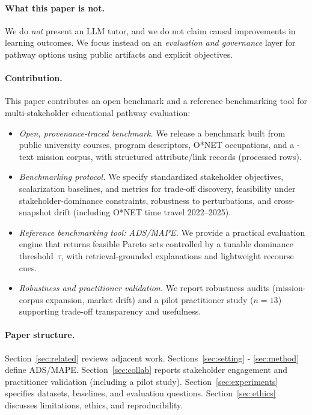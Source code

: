 \documentclass[sigconf,review]{acmart}
\newcommand{\ADS}{\textsc{ADS}\xspace}
\newcommand{\MAPE}{\textsc{MAPE}\xspace}
\begin{document}
\paragraph{What this paper is not.}
We do \emph{not} present an LLM tutor, and we do not claim causal improvements in learning outcomes. We focus instead on an \emph{evaluation and governance} layer for pathway options using public artifacts and explicit objectives.

\paragraph{Contribution.} This paper contributes an open benchmark and a reference benchmarking tool for multi-stakeholder educational pathway evaluation:
\begin{itemize}
  \item \textit{Open, provenance-traced benchmark.} We release a benchmark built from \NumCourses public university courses, \NumPrograms program descriptors, \NumOccupations O*NET occupations, and a \NumMissionsExpanded-text mission corpus, with \NumAttributeRecords structured attribute/link records (\NumProcessedRows processed rows).
  \item \textit{Benchmarking protocol.} We specify standardized stakeholder objectives, scalarization baselines, and metrics for trade-off discovery, feasibility under stakeholder-dominance constraints, robustness to perturbations, and cross-snapshot drift (including O*NET time travel 2022--2025).
  \item \textit{Reference benchmarking tool: \ADS/\MAPE.} We provide a practical evaluation engine that returns feasible Pareto sets controlled by a tunable dominance threshold~$\tau$, with retrieval-grounded explanations and lightweight recourse cues.
  \item \textit{Robustness and practitioner validation.} We report robustness audits (mission-corpus expansion, market drift) and a pilot practitioner study ($n{=}13$) supporting trade-off transparency and usefulness.
\end{itemize}

\paragraph{Paper structure.}
Section~\ref{sec:related} reviews adjacent work. Sections~\ref{sec:setting} - \ref{sec:method} define \ADS/\MAPE. Section~\ref{sec:collab} reports stakeholder engagement and practitioner validation (including a pilot study). Section~\ref{sec:experiments} specifies datasets, baselines, and evaluation questions. Section~\ref{sec:ethics} discusses limitations, ethics, and reproducibility.
\end{document}
